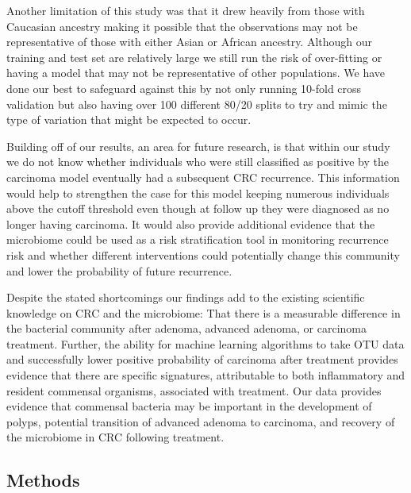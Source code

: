 \documentclass[12pt,]{article}
\begin{document}
Another limitation of this study was that it drew heavily from those
with Caucasian ancestry making it possible that the observations may not
be representative of those with either Asian or African ancestry.
Although our training and test set are relatively large we still run the
risk of over-fitting or having a model that may not be representative of
other populations. We have done our best to safeguard against this by
not only running 10-fold cross validation but also having over 100
different 80/20 splits to try and mimic the type of variation that might
be expected to occur.

Building off of our results, an area for future research, is that within
our study we do not know whether individuals who were still classified
as positive by the carcinoma model eventually had a subsequent CRC
recurrence. This information would help to strengthen the case for this
model keeping numerous individuals above the cutoff threshold even
though at follow up they were diagnosed as no longer having carcinoma.
It would also provide additional evidence that the microbiome could be
used as a risk stratification tool in monitoring recurrence risk and
whether different interventions could potentially change this community
and lower the probability of future recurrence.

Despite the stated shortcomings our findings add to the existing
scientific knowledge on CRC and the microbiome: That there is a
measurable difference in the bacterial community after adenoma, advanced
adenoma, or carcinoma treatment. Further, the ability for machine
learning algorithms to take OTU data and successfully lower positive
probability of carcinoma after treatment provides evidence that there
are specific signatures, attributable to both inflammatory and resident
commensal organisms, associated with treatment. Our data provides
evidence that commensal bacteria may be important in the development of
polyps, potential transition of advanced adenoma to carcinoma, and
recovery of the microbiome in CRC following treatment.

\newpage

\subsection{Methods}\label{methods}
\end{document}
